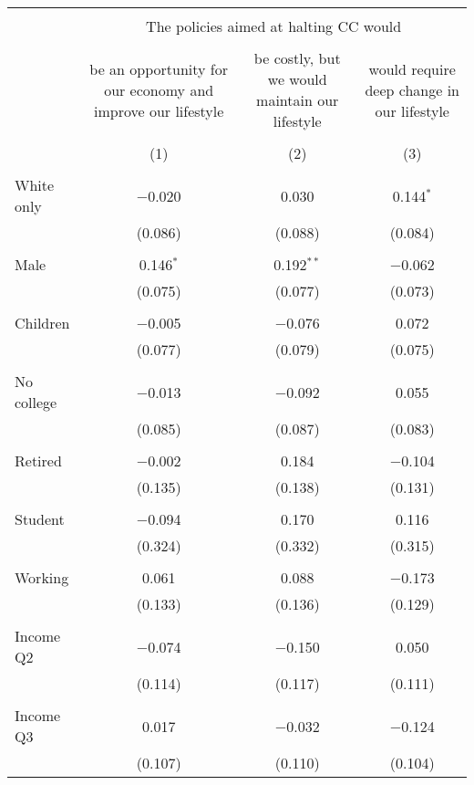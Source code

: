
\begin{tabular}{@{\extracolsep{5pt}}lccc} 
\\[-1.8ex]\hline 
\hline \\[-1.8ex] 
 & \multicolumn{3}{c}{The policies aimed at halting CC would } \\ 
\cline{2-4} 
\\[-1.8ex] & be an opportunity for our economy and improve our lifestyle & be costly, but we would maintain our lifestyle & would require deep change in our lifestyle \\ 
\\[-1.8ex] & (1) & (2) & (3)\\ 
\hline \\[-1.8ex] 
 White only & $-$0.020 & 0.030 & 0.144$^{*}$ \\ 
  & (0.086) & (0.088) & (0.084) \\ 
  & & & \\ 
 Male & 0.146$^{*}$ & 0.192$^{**}$ & $-$0.062 \\ 
  & (0.075) & (0.077) & (0.073) \\ 
  & & & \\ 
 Children & $-$0.005 & $-$0.076 & 0.072 \\ 
  & (0.077) & (0.079) & (0.075) \\ 
  & & & \\ 
 No college & $-$0.013 & $-$0.092 & 0.055 \\ 
  & (0.085) & (0.087) & (0.083) \\ 
  & & & \\ 
 Retired & $-$0.002 & 0.184 & $-$0.104 \\ 
  & (0.135) & (0.138) & (0.131) \\ 
  & & & \\ 
 Student & $-$0.094 & 0.170 & 0.116 \\ 
  & (0.324) & (0.332) & (0.315) \\ 
  & & & \\ 
 Working & 0.061 & 0.088 & $-$0.173 \\ 
  & (0.133) & (0.136) & (0.129) \\ 
  & & & \\ 
 Income Q2 & $-$0.074 & $-$0.150 & 0.050 \\ 
  & (0.114) & (0.117) & (0.111) \\ 
  & & & \\ 
 Income Q3 & 0.017 & $-$0.032 & $-$0.124 \\ 
  & (0.107) & (0.110) & (0.104) \\ 

\end{tabular}
